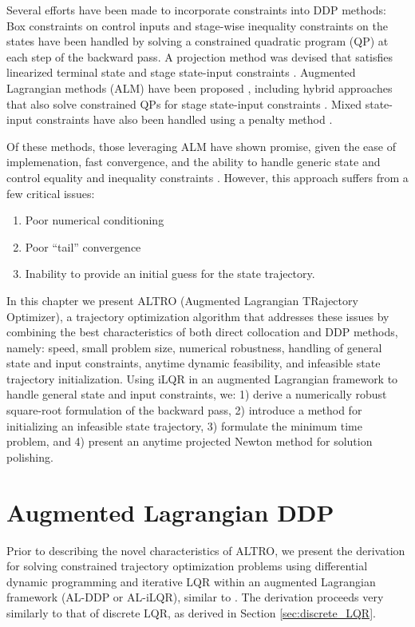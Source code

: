 \documentclass[../root.tex]{subfiles}
\begin{document}
Several efforts have been made to incorporate constraints into DDP methods:
Box constraints on control inputs \cite{tassa_Controllimited_2014} and stage-wise inequality
constraints on the states \cite{xie_Differential_2017,lin_Differential_1991} 
have been handled by solving a
constrained quadratic program (QP) at each step of the backward pass. A
projection method was devised that satisfies linearized terminal state and
stage state-input constraints \cite{giftthaler_Projection_2017}. Augmented Lagrangian
methods (ALM) have been proposed \cite{plancher_Constrained_2017}, including hybrid
approaches that also solve constrained QPs for stage state-input constraints
\cite{lantoine_Hybrid_,lin_Differential_1991}. Mixed state-input constraints have also been
handled using a penalty method \cite{farshidian_Efficient_2017}.

Of these methods, those leveraging ALM have shown promise, given the ease of
implemenation, fast convergence, and the ability to handle generic state and
control equality and inequality constraints \cite{plancher_Constrained_2017}. 
However, this approach suffers from a few critical issues:
\begin{enumerate}
    \item Poor numerical conditioning
    \item Poor ``tail'' convergence
    \item Inability to provide an initial guess for the state trajectory.
\end{enumerate}
In this chapter we present ALTRO (Augmented Lagrangian TRajectory Optimizer), a
trajectory optimization algorithm that addresses these issues by
combining the best characteristics of
both direct collocation and DDP methods, namely: speed, small problem size,
numerical robustness, handling of general state and input constraints,
anytime dynamic feasibility, and infeasible state trajectory initialization.
Using iLQR in an augmented Lagrangian framework to handle general state and
input constraints, we: 1) derive a numerically robust square-root formulation
of the backward pass, 2) introduce a method for initializing an infeasible
state trajectory, 3) formulate the minimum time problem, and 4) present an
anytime projected Newton method for solution polishing.

\section{Augmented Lagrangian DDP}

Prior to describing the novel characteristics of ALTRO, we present the
derivation for solving constrained trajectory optimization problems using
differential dynamic programming and iterative LQR within an augmented
Lagrangian framework (AL-DDP or AL-iLQR), similar to
\cite{plancher_Constrained_2017}. The derivation proceeds very similarly to
that of discrete LQR, as derived in Section \ref{sec:discrete_LQR}.
\end{document}
